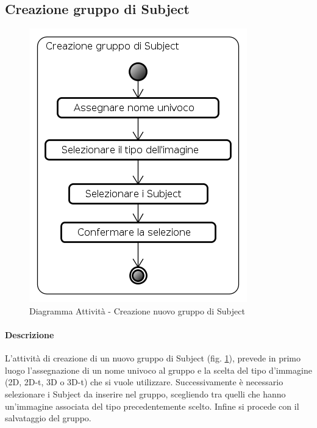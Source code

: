 \subsection{Creazione gruppo di Subject}
\label{newGr}
\begin{figure}[!h]
	\centering
	\includegraphics[scale=0.6]{./img/Diagrammi_Attivita/Creazione_gruppo_di_Subject}
	\caption{Diagramma Attività - Creazione nuovo gruppo di Subject}
	\label{newGroup}
\end{figure}
\paragraph{Descrizione\\}
L'attività di creazione di un nuovo gruppo di Subject\glossario{} (fig. \ref{newGroup}), prevede in primo luogo l'assegnazione di un nome univoco al gruppo e la scelta del tipo d'immagine (2D, 2D-t, 3D o 3D-t) che si vuole utilizzare. Successivamente è necessario selezionare i Subject\glossario{} da inserire nel gruppo, scegliendo tra quelli che hanno un'immagine associata del tipo precedentemente scelto. Infine si procede con il salvataggio del gruppo.
\pagebreak

